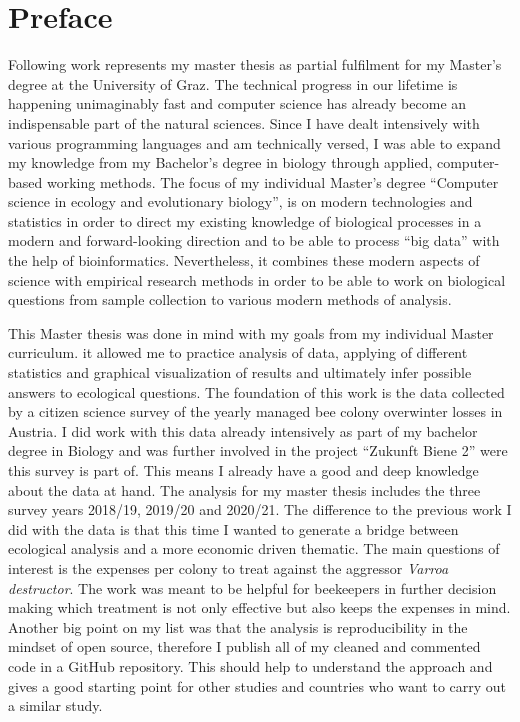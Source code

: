 \chapter*{Preface}
\label{sec:Preface}
\vspace*{-10mm}

Following work represents my master thesis as partial fulfilment for my Master's degree at the University of Graz. The technical progress in our lifetime is happening unimaginably fast and computer science has already become an indispensable part of the natural sciences. Since I have dealt intensively with various programming languages and am technically versed, I was able to expand my knowledge from my Bachelor's degree in biology through applied, computer-based working methods. The focus of my individual Master's degree \enquote{Computer science in ecology and evolutionary biology}, is on modern technologies and statistics in order to direct my existing knowledge of biological processes in a modern and forward-looking direction and to be able to process \enquote{big data} with the help of bioinformatics. Nevertheless, it combines these modern aspects of science with empirical research methods in order to be able to work on biological questions from sample collection to various modern methods of analysis.

This Master thesis was done in mind with my goals from my individual Master curriculum. it allowed me to practice analysis of data, applying of different statistics and graphical visualization of results and ultimately infer possible answers to ecological questions. The foundation of this work is the data collected by a citizen science survey of the yearly managed bee colony overwinter losses in Austria. I did work with this data already intensively as part of my bachelor degree in Biology and was further involved in the project \enquote{Zukunft Biene 2} were this survey is part of. This means I already have a good and deep knowledge about the data at hand. The analysis for my master thesis includes the three survey years 2018/19, 2019/20 and 2020/21. The difference to the previous work I did with the data is that this time I wanted to generate a bridge between ecological analysis and a more economic driven thematic. The main questions of interest is the expenses per colony to treat against the aggressor \textit{Varroa destructor}. The work was meant to be helpful for beekeepers in further decision making which treatment is not only effective but also keeps the expenses in mind. Another big point on my list was that the analysis is reproducibility in the mindset of open source, therefore I publish all of my cleaned and commented code in a GitHub repository. This should help to understand the approach and gives a good starting point for other studies and countries who want to carry out a similar study.